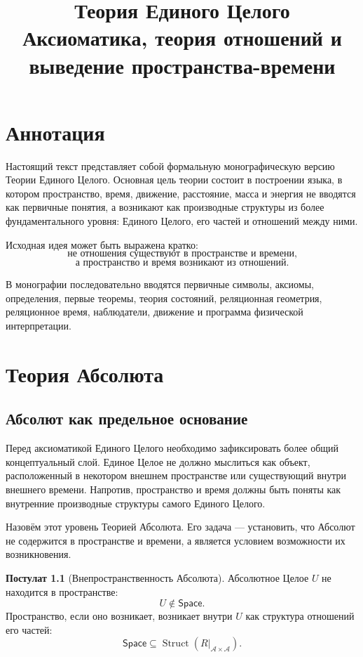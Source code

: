 \documentclass[12pt,a4paper,oneside]{book}
\title{\Huge\textbf{Теория Единого Целого}\\[0.8em]
\Large Аксиоматика, теория отношений и выведение пространства-времени}
\author{}
\date{}
\theoremstyle{definition}
\newtheorem{postulate}{Постулат}[chapter]
\theoremstyle{plain}
\theoremstyle{remark}
\newcommand{\Whole}{U}
\newcommand{\Parts}{\mathcal A}
\newcommand{\Rel}{R}
\newcommand{\Space}{\mathsf{Space}}
\newcommand{\Struct}{\operatorname{Struct}}
\begin{document}
\frontmatter
\maketitle

\chapter*{Аннотация}

Настоящий текст представляет собой формальную монографическую версию Теории Единого Целого. Основная цель теории состоит в построении языка, в котором пространство, время, движение, расстояние, масса и энергия не вводятся как первичные понятия, а возникают как производные структуры из более фундаментального уровня: Единого Целого, его частей и отношений между ними.

Исходная идея может быть выражена кратко:
\[
\boxed{\text{не отношения существуют в пространстве и времени,}}
\]
\[
\boxed{\text{а пространство и время возникают из отношений.}}
\]

В монографии последовательно вводятся первичные символы, аксиомы, определения, первые теоремы, теория состояний, реляционная геометрия, реляционное время, наблюдатели, движение и программа физической интерпретации.

\tableofcontents

\mainmatter
\setcounter{chapter}{-1}

\chapter{Теория Абсолюта}

\section{Абсолют как предельное основание}

Перед аксиоматикой Единого Целого необходимо зафиксировать более общий концептуальный слой. Единое Целое не должно мыслиться как объект, расположенный в некотором внешнем пространстве или существующий внутри внешнего времени. Напротив, пространство и время должны быть поняты как внутренние производные структуры самого Единого Целого.

Назовём этот уровень Теорией Абсолюта. Его задача --- установить, что Абсолют не содержится в пространстве и времени, а является условием возможности их возникновения.

\begin{postulate}[Внепространственность Абсолюта]
Абсолютное Целое \(\Whole\) не находится в пространстве:
\[
\Whole \notin \Space.
\]
Пространство, если оно возникает, возникает внутри \(\Whole\) как структура отношений его частей:
\[
\Space \subseteq \Struct(\Rel|_{\Parts\times\Parts}).
\]
\end{postulate}
\end{document}
